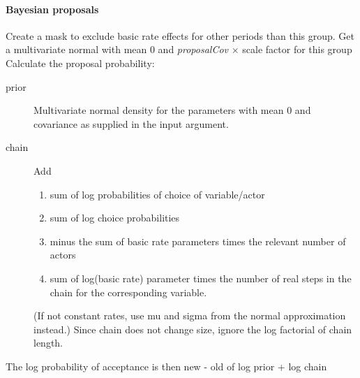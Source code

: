 \documentclass[12pt,a4paper]{article}
\renewcommand{\=}{\,=\,}
\newcommand{\+}{\,+\,}
\newcommand{\nnm}[1]{\textsf{\small\textit{#1}}}
\begin{document}
\paragraph{Bayesian proposals}
\label{sec:prop}
\begin{algorithmic}
\STATE Create a mask to exclude basic rate effects for other periods than this
group.
\STATE Get a multivariate normal with mean 0 and  \nnm{proposalCov}
 $\times$ scale factor for this group
\STATE Calculate the proposal probability:
\begin{description}
\item[prior] Multivariate normal density for the parameters with mean 0
  and covariance as supplied in the input argument.
\item[chain] Add
\begin{enumerate}
\item sum of log probabilities of choice of variable/actor
\item sum of log choice probabilities
\item minus the sum of basic rate parameters times the
relevant number of actors
\item sum of log(basic rate) parameter times the
number of real steps in the chain for the corresponding variable.
\end{enumerate}
(If not constant rates, use mu and sigma from the normal approximation instead.)
Since chain does not change size, ignore the log factorial of chain length.
\end{description}
\STATE The log probability of acceptance is then new - old  of log prior +
log chain
\ENDFOR
\end{algorithmic}
\end{document}
